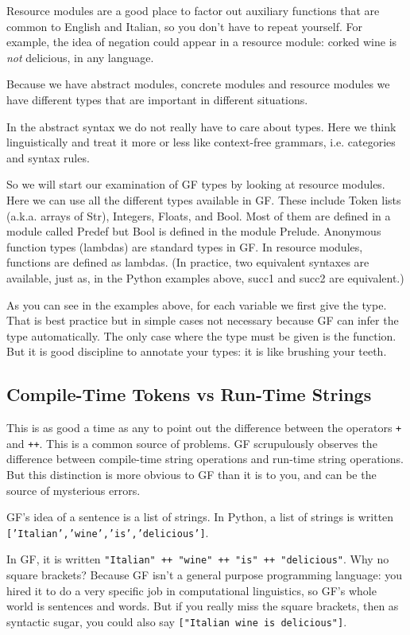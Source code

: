 \documentclass{scrartcl}
\begin{document}
Resource modules are a good place to factor out auxiliary functions that are common to English and Italian, so you don't have to repeat yourself. For example, the idea of negation could appear in a resource module: corked wine is \emph{not} delicious, in any language.

Because we have abstract modules, concrete modules and resource modules we have different types that are important in different situations.

In the abstract syntax we do not really have to care about types. Here we think linguistically and treat it more or less like context-free grammars, i.e. categories and syntax rules.

So we will start our examination of GF types by looking at resource modules. Here we can use all the different types available in GF. These include Token lists (a.k.a. arrays of Str), Integers, Floats, and Bool. Most of them are defined in a module called Predef but Bool is defined in the module Prelude. Anonymous function types (lambdas) are standard types in GF. In resource modules, functions are defined as lambdas. (In practice, two equivalent syntaxes are available, just as, in the Python examples above, succ1 and succ2 are equivalent.)



As you can see in the examples above, for each variable we first give the type. That is best practice but in simple cases not necessary because GF can infer the type automatically. The only case where the type must be given is the function. But it is good discipline to annotate your types: it is like brushing your teeth.

\subsection{Compile-Time Tokens vs Run-Time Strings}

This is as good a time as any to point out the difference between the operators \texttt{+} and \texttt{++}. This is a common source of problems. GF scrupulously observes the difference between compile-time string operations and run-time string operations. But this distinction is more obvious to GF than it is to you, and can be the source of mysterious errors.

GF's idea of a sentence is a list of strings. In Python, a list of strings is written \texttt{['Italian','wine','is','delicious']}.

In GF, it is written \texttt{"Italian" ++ "wine" ++ "is" ++ "delicious"}. Why no square brackets? Because GF isn't a general purpose programming language: you hired it to do a very specific job in computational linguistics, so GF's whole world is sentences and words. But if you really miss the square brackets, then as syntactic sugar, you could also say \texttt{["Italian wine is delicious"]}.
\end{document}
